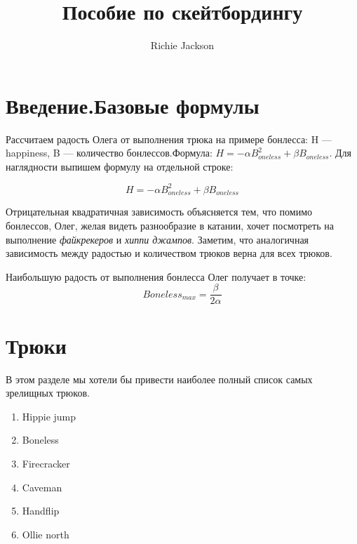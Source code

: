 \documentclass[12pt]{article} %
\title{Пособие по скейтбордингу}
\author{Richie Jackson}
\begin{document}
\maketitle %

\section{Введение.Базовые формулы} %

\par %

Рассчитаем радость Олега от выполнения трюка на примере бонлесса: H --- happiness, B --- количество бонлессов.Формула: $H = -\alpha B_{oneless}^{2} + \beta B_{oneless}$. Для наглядности выпишем формулу на отдельной строке:


\[
H = -\alpha B_{oneless}^{2} + \beta B_{oneless}
\]

Отрицательная квадратичная зависимость объясняется тем, что помимо бонлессов, Олег, желая видеть разнообразие в катании, хочет посмотреть на выполнение \textit{файкрекеров} и \textit{хиппи джампов}. Заметим, что аналогичная зависимость между радостью и количеством трюков верна для всех трюков. 

\par

Наибольшую радость от выполнения бонлесса Олег получает в точке:
\[
Boneless_{max} = \frac{\beta}{2\alpha}
\]

\section{Трюки}

В этом разделе мы хотели бы привести наиболее полный список самых зрелищных трюков. 

\begin{enumerate} %

\item Hippie jump
\item Boneless
\item Firecracker
\item Caveman
\item Handflip
\item Ollie north
	
\end{enumerate}
\end{document}
